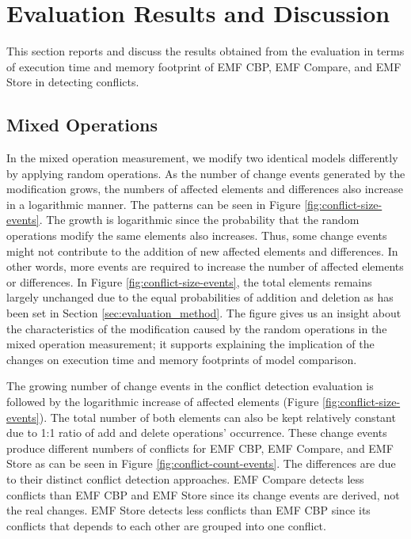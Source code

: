 \section{Evaluation Results and Discussion}
\label{sec:evaluation_discussion}
This section reports and discuss the results obtained from the evaluation in terms of execution time and memory footprint of EMF CBP, EMF Compare, and EMF Store in detecting conflicts. 

\subsection{Mixed Operations}
\label{sec:mixed-operation_conflict}

In the mixed operation measurement, we modify two identical models differently by applying random operations. As the number of change events generated by the modification grows, the numbers of affected elements and differences also increase in a logarithmic manner. The patterns can be seen in Figure \ref{fig:conflict-size-events}. The growth is logarithmic since the probability that the random operations modify the same elements also increases. Thus, some change events might not contribute to the addition of new affected elements and differences. In other words, more events are required to increase the number of affected elements or differences. In Figure \ref{fig:conflict-size-events}, the total elements remains largely unchanged due to the equal probabilities of addition and deletion as has been set in Section \ref{sec:evaluation_method}. The figure gives us an insight about the characteristics of the modification caused by the random operations in the mixed operation measurement; it supports explaining the implication of the changes on execution time and memory footprints of model comparison.

The growing number of change events in the conflict detection evaluation is followed by the logarithmic increase of affected elements (Figure \ref{fig:conflict-size-events}). The total number of both elements can also be kept relatively constant due to 1:1 ratio of \textsf{add} and \textsf{delete} operations' occurrence. These change events produce different numbers of conflicts for EMF CBP, EMF Compare, and EMF Store as can be seen in Figure \ref{fig:conflict-count-events}. The differences are due to their distinct conflict detection approaches. EMF Compare detects less conflicts than EMF CBP and EMF Store since its change events are derived, not the real changes. EMF Store detects less conflicts than EMF CBP since its conflicts that depends to each other are grouped into one conflict.

